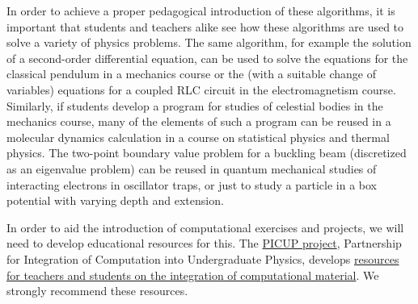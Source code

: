 \documentclass[%
oneside,                 %
final,                   %
10pt]{article}
\begin{document}
\noindent
In order to achieve a proper pedagogical introduction of these algorithms, it is important that students and teachers alike see how these algorithms are used to solve a variety of physics problems. The same algorithm, for example the solution of a second-order differential equation, can be used to solve the equations for the classical pendulum in a mechanics course or the (with a suitable change of variables) equations for a coupled RLC circuit in the electromagnetism course. Similarly, if students develop a program for studies of celestial bodies in the mechanics course, many of the elements of such a program can be reused in a molecular dynamics calculation in a course on statistical physics and thermal physics. The two-point boundary value problem for a buckling beam
(discretized as an eigenvalue problem) can be reused in quantum mechanical studies of interacting electrons in oscillator traps, or just to study a particle in a box potential with varying depth and extension. 

In order to aid the introduction of computational exercises and projects, we will need to develop educational resources for this. The \href{{http://www.compadre.org/picup/}}{PICUP project},  Partnership for Integration of Computation into Undergraduate Physics, develops \href{{http://www.compadre.org/PICUP/resources/}}{resources for teachers and students on the integration of computational  material}.   We strongly recommend these resources.
\end{document}
